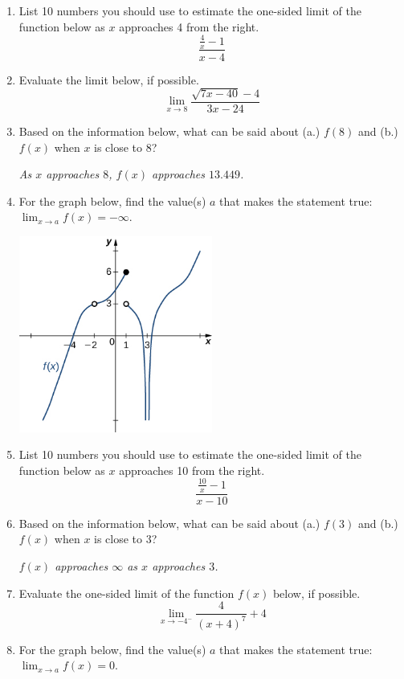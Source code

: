 \documentclass[14pt]{extbook}
\begin{document}
\begin{enumerate}
\item{
List 10 numbers you should use to estimate the one-sided limit of the function below as $x$ approaches 4 from the right.\[ \frac{\frac{4}{x} - 1}{x - 4} \]} \newpage
\item{
Evaluate the limit below, if possible.\[ \lim_{x \rightarrow 8} \frac{\sqrt{7x - 40} - 4}{3x - 24} \]} \newpage
\item{
Based on the information below, what can be said about (a.) $f(8)$ and (b.) $f(x)$ when $x$ is close to $8$?
\begin{center}
    \textit{ As $x$ approaches $8$, $f(x)$ approaches $13.449$. }
\end{center}
} \newpage
\item{
For the graph below, find the value(s) $a$ that makes the statement true: $ \displaystyle \lim_{x \rightarrow a} f(x) = -\infty$.
\begin{center}
    \includegraphics[width=0.5\textwidth]{../Figures/evaluateLimitGraphicallyC.png}
\end{center}
} \newpage
\item{
List 10 numbers you should use to estimate the one-sided limit of the function below as $x$ approaches 10 from the right.\[ \frac{\frac{10}{x} - 1}{x - 10} \]} \newpage
\item{
Based on the information below, what can be said about (a.) $f(3)$ and (b.) $f(x)$ when $x$ is close to $3$?
\begin{center}
    \textit{ $f(x)$ approaches $\infty$ as $x$ approaches $3$. }
\end{center}
} \newpage
\item{
Evaluate the one-sided limit of the function $f(x)$ below, if possible.\[ \lim_{x \rightarrow -4^-} \frac{4}{(x+4)^7}+4 \]} \newpage
\item{
For the graph below, find the value(s) $a$ that makes the statement true: $ \displaystyle \lim_{x \rightarrow a} f(x) = 0$.
}
\end{enumerate}
\end{document}
